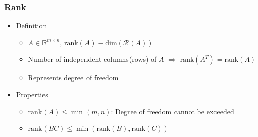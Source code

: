 \subsubsection*{Rank}
\begin{itemize}
    \item Definition
    \begin{itemize}
        \item $A \in \mathbb{R}^{m \times n}$, $\mathrm{rank}(A) \equiv \mathrm{dim}(\mathcal{R}(A))$
        \item Number of independent columns(rows) of $A$ $\Rightarrow$ $\mathrm{rank}(A^T) = \mathrm{rank}(A)$
        \item Represents degree of freedom
    \end{itemize}
    \newpage
    \item Properties
    \begin{itemize}
        \item $\mathrm{rank}(A) \leq \min(m, n)$: Degree of freedom cannot be exceeded
        \item $\mathrm{rank}(BC) \leq \min(\mathrm{rank}(B), \mathrm{rank}(C))$
    \end{itemize}
\end{itemize}


